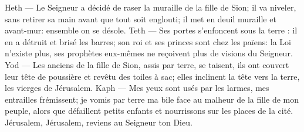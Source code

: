 Heth --- Le Seigneur a décidé de raser la muraille de la fille de Sion;
	il va niveler, sans retirer sa main avant que tout soit englouti;
	il met en deuil muraille et avant-mur: ensemble on se désole.
Teth --- Ses portes s’enfoncent sous la terre : il en a détruit et brisé les barres;
	son roi et ses princes sont chez les païens: la Loi n’existe plus,
	ses prophètes eux-mêmes ne reçoivent plus de visions du Seigneur.
Yod --- Les anciens de la fille de Sion, assis par terre, se taisent,
	ils ont couvert leur tête de poussière et revêtu des toiles à sac;
	elles inclinent la tête vers la terre, les vierges de Jérusalem.
Kaph --- Mes yeux sont usés par les larmes, mes entrailles frémissent;
	je vomis par terre ma bile face au malheur de la fille de mon peuple,
	alors que défaillent petits enfants et nourrissons sur les places de la cité.
Jérusalem, Jérusalem, reviens au Seigneur ton Dieu.
